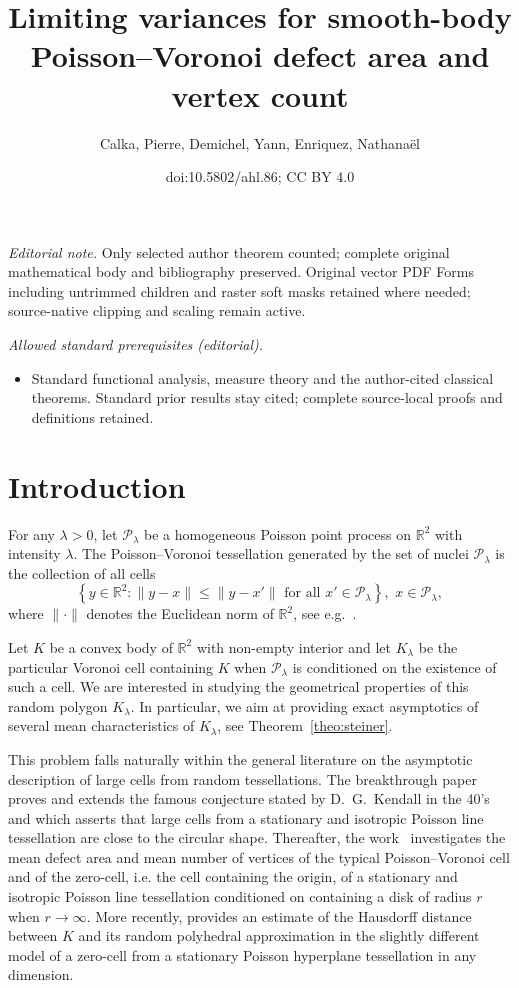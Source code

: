 \documentclass[10pt]{amsart}
\title{Limiting variances for smooth-body Poisson–Voronoi defect area and vertex count}
\author{Calka, Pierre, Demichel, Yann, Enriquez, Nathanaël}
\date{doi:10.5802/ahl.86; CC BY 4.0}
\theoremstyle{definition}\newtheorem{defi}[theo]{Definition}\newtheorem{rema}[theo]{Remark}\newtheorem{exam}[theo]{Example}\newtheorem{exem}[theo]{Example}\newtheorem{nota}[theo]{Notation}
\newcommand{\cP}{\mathcal{P}}
\newcommand{\R}{\mathbb{R}}
\newcommand{\pass}{\vspace{0.3cm}\noindent}
\newcommand{\noi}{\noindent}
\begin{document}
\maketitle
\noindent\textit{Editorial note.} Only selected author theorem counted; complete original mathematical body and bibliography preserved. Original vector PDF Forms including untrimmed children and raster soft masks retained where needed; source-native clipping and scaling remain active.\par\medskip
\noindent\textit{Allowed standard prerequisites (editorial).}\begin{itemize}
\item Standard functional analysis, measure theory and the author-cited classical theorems. Standard prior results stay cited; complete source-local proofs and definitions retained.
\end{itemize}\medskip


\section{Introduction}\label{sec:intro}

For any $\lambda>0$, let $\cP_{\lambda}$ be a homogeneous Poisson point process on $\R^2$ with intensity $\lambda$. The Poisson--Voronoi tessellation generated by the set of nuclei $\cP_\lambda$ is the collection of all cells
\[
\left\{y\in\R^2:\|y-x\|\le \|y-x'\| \text{ for all } x'\in \cP_\lambda\right\}, \,\, x\in \cP_\lambda,
\]
where $\|\cdot\|$ denotes the Euclidean norm of $\R^2$, see e.g.~\cite{mol94,okabe}.

Let $K$ be a convex body of $\R^2$ with non-empty interior and let $K_{\lambda}$ be the particular Voronoi cell containing $K$ when $\cP_\lambda$ is conditioned on the existence of such a cell. We are interested in studying the geometrical properties of this random polygon $K_{\lambda}$. In particular, we aim at providing exact asymptotics of several mean characteristics of $K_{\lambda}$, see Theorem~\ref{theo:steiner}.

This problem falls naturally within the general literature on the asymptotic description of large cells from random tessellations. The breakthrough paper~\cite{hrs04} proves and extends the famous conjecture stated by D.~G.~Kendall in the 40's and which asserts that large cells from a stationary and isotropic Poisson line tessellation are close to the circular shape. Thereafter, the work~\cite{cs05} investigates the mean defect area and mean number of vertices of the typical Poisson--Voronoi cell and of the zero-cell, i.e. the cell containing the origin, of a stationary and isotropic Poisson line tessellation conditioned on containing a disk of radius $r$ when $r\to\infty$. More recently, \cite{hs14} provides an estimate of the Hausdorff distance between $K$ and its random polyhedral approximation in the slightly different model of a zero-cell from a stationary Poisson hyperplane tessellation in any dimension.
\end{document}
